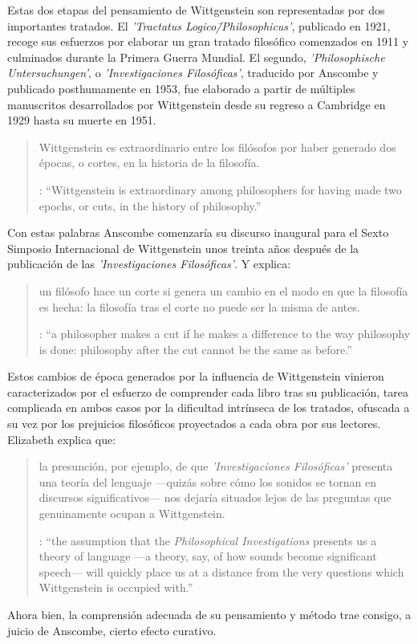 Estas dos etapas del pensamiento de Wittgenstein son representadas por dos importantes tratados. El \emph{'Tractatus Logico\=/Philosophicus'}, publicado en 1921, recoge sus esfuerzos por elaborar un gran tratado filosófico comenzados en 1911 y culminados durante la Primera Guerra Mundial. El segundo, \emph{'Philosophische Untersuchungen'}, o \emph{'Investigaciones Filosóficas'}, traducido por Anscombe y publicado posthumamente en 1953, fue elaborado a partir de múltiples manuscritos desarrollados por Wittgenstein desde su regreso a Cambridge en 1929 hasta su muerte en 1951.

\blockquote[{\cite[181]{anscombe2011plato:twocuts}}: \enquote{Wittgenstein is extraordinary among philosophers for having made two epochs, or cuts, in the history of philosophy.}]{Wittgenstein es extraordinario entre los filósofos por haber generado dos épocas, o cortes, en la historia de la filosofía.} Con estas palabras Anscombe comenzaría su discurso inaugural para el Sexto Simposio Internacional de Wittgenstein unos treinta años después de la publicación de las \emph{'Investigaciones Filosóficas'}. Y explica: \blockquote[{\cite[181]{anscombe2011plato:twocuts}}: \enquote{a philosopher makes a cut if he makes a difference to the way philosophy is done: philosophy after the cut cannot be the same as before.}]{un filósofo hace un corte si genera un cambio en el modo en que la filosofía es hecha: la filosofía tras el corte no puede ser la misma de antes.}

Estos cambios de época generados por la influencia de Wittgenstein vinieron caracterizados por el esfuerzo de comprender cada libro tras su publicación, tarea complicada en ambos casos por la dificultad intrínseca de los tratados, ofuscada a su vez por los prejuicios filosóficos proyectados a cada obra por sus lectores.  Elizabeth explica que: \blockquote[{\cite[Cf.~][183]{anscombe2011plato:twocuts}}: \enquote{the assumption that the \emph{Philosophical Investigations} presents us a theory of language ---a theory, say, of how sounds become significant speech--- will quickly place us at a distance from the very questions which Wittgenstein is occupied with.}]{la presunción, por ejemplo, de que \emph{'Investigaciones Filosóficas'} presenta una teoría del lenguaje ---quizás sobre cómo los sonidos se tornan en discursos significativos--- nos dejaría situados lejos de las preguntas que genuinamente ocupan a Wittgenstein.} Ahora bien, la comprensión adecuada de su pensamiento y método trae consigo, a juicio de Anscombe, cierto efecto curativo.

